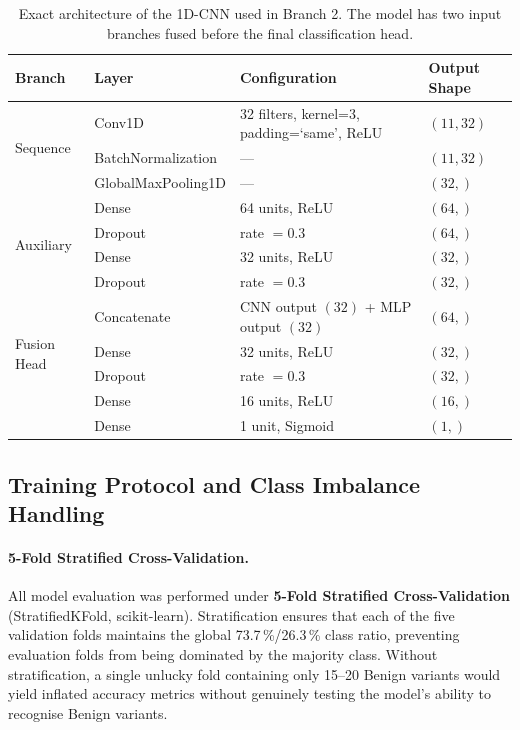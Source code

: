 \documentclass[12pt,a4paper]{article}
\begin{document}
\begin{table}[H]
\centering
\caption{Exact architecture of the 1D-CNN used in Branch 2. The model
         has two input branches fused before the final classification head.}
\label{tab:cnn}
\begin{tabular}{@{}llll@{}}
\toprule
\textbf{Branch} & \textbf{Layer} & \textbf{Configuration} & \textbf{Output Shape} \\
\midrule
\multirow{3}{*}{Sequence}
  & Conv1D             & 32 filters, kernel=3, padding=`same', ReLU & $(11, 32)$ \\
  & BatchNormalization & —                                           & $(11, 32)$ \\
  & GlobalMaxPooling1D & —                                           & $(32,)$ \\
\midrule
\multirow{4}{*}{Auxiliary}
  & Dense              & 64 units, ReLU                              & $(64,)$ \\
  & Dropout            & rate $= 0.3$                                & $(64,)$ \\
  & Dense              & 32 units, ReLU                              & $(32,)$ \\
  & Dropout            & rate $= 0.3$                                & $(32,)$ \\
\midrule
\multirow{4}{*}{Fusion Head}
  & Concatenate        & CNN output $(32)$ + MLP output $(32)$       & $(64,)$ \\
  & Dense              & 32 units, ReLU                              & $(32,)$ \\
  & Dropout            & rate $= 0.3$                                & $(32,)$ \\
  & Dense              & 16 units, ReLU                              & $(16,)$ \\
  & Dense              & 1 unit, Sigmoid                             & $(1,)$ \\
\bottomrule
\end{tabular}
\end{table}


\subsection{Training Protocol and Class Imbalance Handling}
\label{subsec:training}

\paragraph{5-Fold Stratified Cross-Validation.}
All model evaluation was performed under \textbf{5-Fold Stratified
Cross-Validation} (StratifiedKFold, scikit-learn). Stratification ensures
that each of the five validation folds maintains the global 73.7\,\%/26.3\,\%
class ratio, preventing evaluation folds from being dominated by the majority
class. Without stratification, a single unlucky fold containing only 15--20
Benign variants would yield inflated accuracy metrics without genuinely
testing the model's ability to recognise Benign variants.
\end{document}
